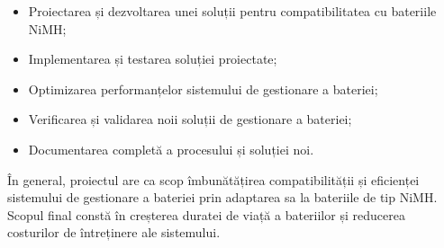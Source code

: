 \begin{itemize}
\item Proiectarea și dezvoltarea unei soluții pentru compatibilitatea cu bateriile NiMH;
\item Implementarea și testarea soluției proiectate;
\item Optimizarea performanțelor sistemului de gestionare a bateriei;
\item Verificarea și validarea noii soluții de gestionare a bateriei;
\item Documentarea completă a procesului și soluției noi.
\end{itemize}

În general, proiectul are ca scop îmbunătățirea compatibilității și eficienței sistemului de gestionare a bateriei prin adaptarea sa la bateriile de tip NiMH. Scopul final constă în creșterea duratei de viață a bateriilor și reducerea costurilor de întreținere ale sistemului.
